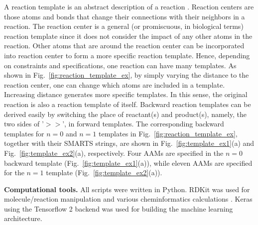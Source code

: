 \documentclass{article}
\begin{document}
A reaction template is an abstract description of a reaction \citep{lin2019retrosynthetic}. 
Reaction centers are those atoms and bonds that change their connections with their neighbors in a reaction.
The reaction center is a general (or promiscuous, in biological terms) reaction template since it does not consider the impact of any other atoms in the reaction. 
Other atoms that are around the reaction center can be incorporated into reaction center to form a more specific reaction template. 
Hence, depending on constraints and specifications, one reaction can have many templates.
As shown in Fig.~\ref{fig:reaction_template_ex}, by simply varying the distance to the reaction center, one can change which atoms are included in a template. Increasing distance generates more specific templates. In this sense, the original reaction is also a reaction template of itself. 
Backward reaction templates can be derived easily by switching the place of reactant(s) and product(s), namely, the two sides of '$>>$', in forward templates. 
The corresponding backward templates for $n=0$ and $n=1$ templates in Fig.~\ref{fig:reaction_template_ex}, together with their SMARTS strings, are shown in Fig.~\ref{fig:template_ex1}(a) and Fig.~\ref{fig:template_ex2}(a), respectively.
Four AAMs are specified in the $n=0$ backward template (Fig.~\ref{fig:template_ex1}(a)), while eleven AAMs are specified for the $n=1$ template (Fig.~\ref{fig:template_ex2}(a)).


\textbf{Computational tools.}
All scripts were written in Python. 
RDKit was used for molecule/reaction manipulation and various cheminformatics calculations \citep{rdkit}. 
Keras \citep{geron2019hands} using the Tensorflow 2 \citep{abadi2016tensorflow} backend was used for building the machine learning architecture. 


\end{document}
